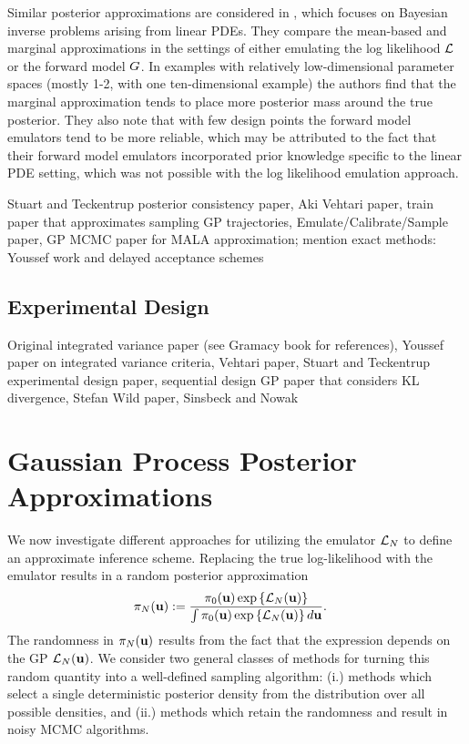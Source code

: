 \documentclass[12pt]{article}
\begin{document}
Similar posterior approximations are considered in \cite{GP_PDE_priors}, which focuses on Bayesian inverse problems arising from linear PDEs. They 
compare the mean-based and marginal approximations in the settings of either emulating the log likelihood $\mathcal{L}$ or the forward model $G$. In examples 
with relatively low-dimensional parameter spaces (mostly 1-2, with one ten-dimensional example) the authors find that the marginal approximation tends to 
place more posterior mass around the true posterior. They also note that with few design points the forward model emulators tend to be more reliable, which 
may be attributed to the fact that their forward model emulators incorporated prior knowledge specific to the linear PDE setting, which was not possible with 
the log likelihood emulation approach. 


Stuart and Teckentrup posterior consistency paper, Aki Vehtari paper, train paper that approximates sampling GP trajectories, Emulate/Calibrate/Sample paper, 
GP MCMC paper for MALA approximation; mention exact methods: Youssef work and delayed acceptance schemes 

\subsection{Experimental Design}
Original integrated variance paper (see Gramacy book for references), Youssef paper on integrated variance criteria, Vehtari paper, Stuart and Teckentrup experimental 
design paper, sequential design GP paper that considers KL divergence, Stefan Wild paper, Sinsbeck and Nowak 

\section{Gaussian Process Posterior Approximations}
We now investigate different approaches for utilizing the emulator $\mathcal{L}_{N}$ to define an approximate inference scheme. Replacing the true log-likelihood 
with the emulator results in a random posterior approximation 
\begin{align}
\pi_{N}(\mathbf{u})
&:= \frac{\pi_0(\mathbf{u}) \exp\left\{\mathcal{L}_{N}(\mathbf{u}) \right\}}{\int \pi_0(\mathbf{u}) \exp\left\{\mathcal{L}_{N}(\mathbf{u}) \right\} d\mathbf{u}}.
\end{align}
The randomness in $\pi_{N}(\mathbf{u})$ results from the fact that the expression depends on the GP $\mathcal{L}_{N}(\mathbf{u})$. We consider 
two general classes of methods for turning this random quantity into a well-defined sampling algorithm: (i.) methods which select a single deterministic 
posterior density from the distribution over all possible densities, and (ii.) methods which retain the randomness and result in noisy MCMC algorithms. 
\end{document}
